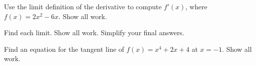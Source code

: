 \documentclass[addpoints,12pt]{exam}
\begin{document}
\begin{questions}

\vspace{2in}

\newpage

\question[11] Use the limit definition of the derivative to compute $f'(x)$, where $f(x)=2x^2-6x$.
Show all work.


\newpage

\question

Find each limit. Show all work. Simplify your final answers.


\newpage


\question[10] Find an equation for the tangent line of $f(x)=x^4+2x+4$ at $x=-1$. Show all work.


\newpage





\end{questions}
\end{document}

